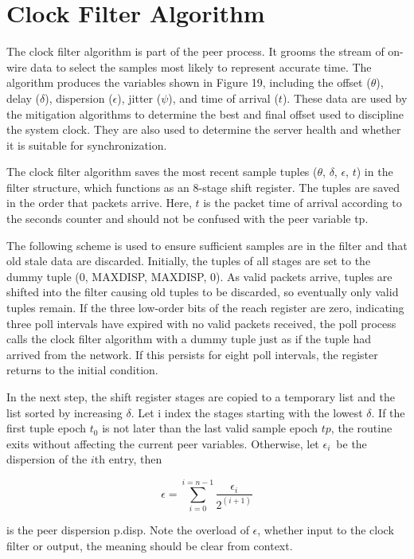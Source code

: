 \chapter{Clock Filter Algorithm}

The clock filter algorithm is part of the peer process.  It grooms
the stream of on-wire data to select the samples most likely to
represent accurate time.  The algorithm produces the variables shown
in Figure 19, including the offset ($ \theta $), delay ($ \delta $), dispersion
($ \epsilon $), jitter ($ \psi $), and time of arrival ($ t $).  These data are
used by the mitigation algorithms to determine the best and final
offset used to discipline the system clock.  They are also used to
determine the server health and whether it is suitable for
synchronization.

The clock filter algorithm saves the most recent sample tuples
($ \theta $, $ \delta $, $ \epsilon $, $ t $) in the filter structure, which functions
as an 8-stage shift register.  The tuples are saved in the order that
packets arrive.  Here, $ t $ is the packet time of arrival according to
the seconds counter and should not be confused with the peer variable
tp.

The following scheme is used to ensure sufficient samples are in the
filter and that old stale data are discarded.  Initially, the tuples
of all stages are set to the dummy tuple (0, MAXDISP, MAXDISP, 0).
As valid packets arrive, tuples are shifted into the filter causing
old tuples to be discarded, so eventually only valid tuples remain.
If the three low-order bits of the reach register are zero,
indicating three poll intervals have expired with no valid packets
received, the poll process calls the clock filter algorithm with a
dummy tuple just as if the tuple had arrived from the network.  If
this persists for eight poll intervals, the register returns to the
initial condition.

In the next step, the shift register stages are copied to a temporary
list and the list sorted by increasing $ \delta $.  Let i index the stages
starting with the lowest $ \delta $.  If the first tuple epoch $t_0 $ is not
later than the last valid sample epoch $ tp $, the routine exits without
affecting the current peer variables.  Otherwise, let $ \epsilon_i $\ be
the dispersion of the $ i $th entry, then

$$
\epsilon = \sum^{i = n - 1}_{i = 0} \frac{\epsilon_i}{2^{(i + 1)}}
$$

is the peer dispersion p.disp.  Note the overload of $ \epsilon $, whether
input to the clock filter or output, the meaning should be clear from
context.


